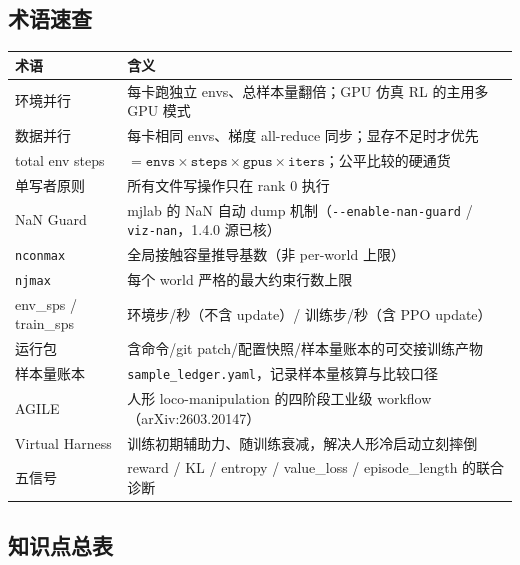 \subsection*{术语速查}

\begin{table}[H]\centering\small
\begin{tabular}{@{}p{3.4cm}p{8.4cm}@{}}
\toprule
术语 & 含义 \\
\midrule
环境并行 & 每卡跑独立 envs、总样本量翻倍；GPU 仿真 RL 的主用多 GPU 模式 \\
数据并行 & 每卡相同 envs、梯度 all-reduce 同步；显存不足时才优先 \\
total env steps & $=\texttt{envs}\times\texttt{steps}\times\texttt{gpus}\times\texttt{iters}$；公平比较的硬通货 \\
单写者原则 & 所有文件写操作只在 rank 0 执行 \\
NaN Guard & mjlab 的 NaN 自动 dump 机制（\verb|--enable-nan-guard| / \verb|viz-nan|，1.4.0 源已核） \\
\verb|nconmax| & 全局接触容量推导基数（非 per-world 上限） \\
\verb|njmax| & 每个 world 严格的最大约束行数上限 \\
env\_sps / train\_sps & 环境步/秒（不含 update）/ 训练步/秒（含 PPO update） \\
运行包 & 含命令/git patch/配置快照/样本量账本的可交接训练产物 \\
样本量账本 & \verb|sample_ledger.yaml|，记录样本量核算与比较口径 \\
AGILE & 人形 loco-manipulation 的四阶段工业级 workflow（arXiv:2603.20147） \\
Virtual Harness & 训练初期辅助力、随训练衰减，解决人形冷启动立刻摔倒 \\
五信号 & reward / KL / entropy / value\_loss / episode\_length 的联合诊断 \\
\bottomrule
\end{tabular}
\end{table}

\subsection*{知识点总表}


